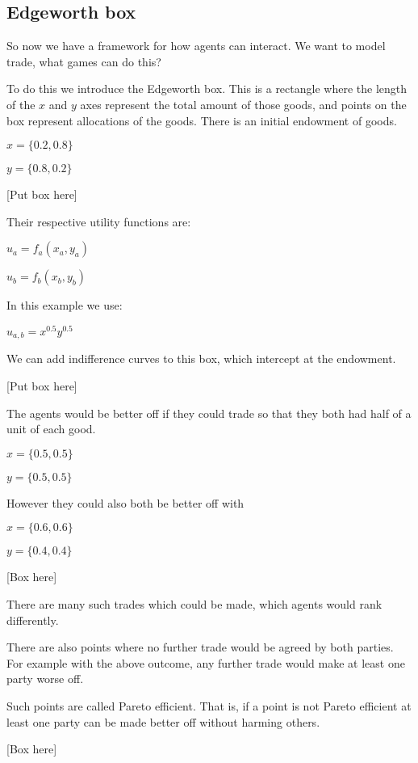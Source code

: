 
\subsection{Edgeworth box}

So now we have a framework for how agents can interact. We want to model trade, what games can do this?

To do this we introduce the Edgeworth box. This is a rectangle where the length of the \(x\) and \(y\) axes represent the total amount of those goods, and points on the box represent allocations of the goods. There is an initial endowment of goods.

\(x=\{0.2,0.8\}\)

\(y=\{0.8,0.2\}\)

[Put box here]

Their respective utility functions are:

\(u_a=f_a(x_a,y_a)\)

\(u_b=f_b(x_b,y_b)\)

In this example we use:

\(u_{a,b}=x^{0.5}y^{0.5}\)

We can add indifference curves to this box, which intercept at the endowment.

[Put box here]

The agents would be better off if they could trade so that they both had half of a unit of each good.

\(x=\{0.5,0.5\}\)

\(y=\{0.5,0.5\}\)

However they could also both be better off with

\(x=\{0.6,0.6\}\)

\(y=\{0.4,0.4\}\)

[Box here]

There are many such trades which could be made, which agents would rank differently.

There are also points where no further trade would be agreed by both parties. For example with the above outcome, any further trade would make at least one party worse off.

Such points are called Pareto efficient. That is, if a point is not Pareto efficient at least one party can be made better off without harming others.

[Box here]

